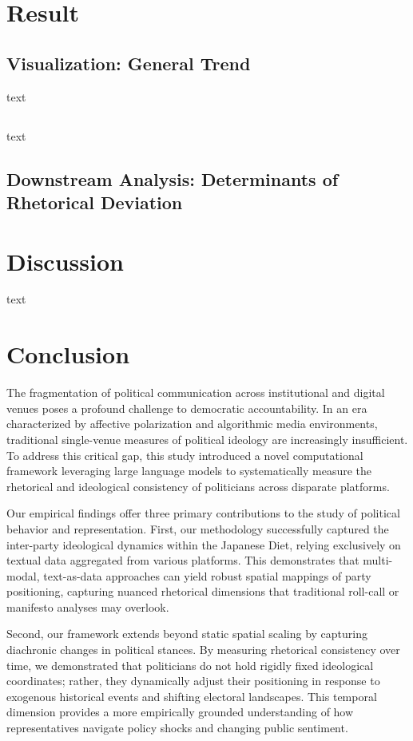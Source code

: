 \documentclass[11pt,letterpaper]{article}
\theoremstyle{plain}
\begin{document}
\section{Result}
\subsection{Visualization: General Trend}
text
\subsection{}
text
\subsection{Downstream Analysis: Determinants of Rhetorical Deviation}

\section{Discussion}
text
\section{Conclusion}
The fragmentation of political communication across institutional and digital venues poses a profound challenge to democratic accountability. In an era characterized by affective polarization and algorithmic media environments, traditional single-venue measures of political ideology are increasingly insufficient. To address this critical gap, this study introduced a novel computational framework leveraging large language models to systematically measure the rhetorical and ideological consistency of politicians across disparate platforms.

Our empirical findings offer three primary contributions to the study of political behavior and representation. First, our methodology successfully captured the inter-party ideological dynamics within the Japanese Diet, relying exclusively on textual data aggregated from various platforms. This demonstrates that multi-modal, text-as-data approaches can yield robust spatial mappings of party positioning, capturing nuanced rhetorical dimensions that traditional roll-call or manifesto analyses may overlook. 

Second, our framework extends beyond static spatial scaling by capturing diachronic changes in political stances. By measuring rhetorical consistency over time, we demonstrated that politicians do not hold rigidly fixed ideological coordinates; rather, they dynamically adjust their positioning in response to exogenous historical events and shifting electoral landscapes. This temporal dimension provides a more empirically grounded understanding of how representatives navigate policy shocks and changing public sentiment.
\end{document}
